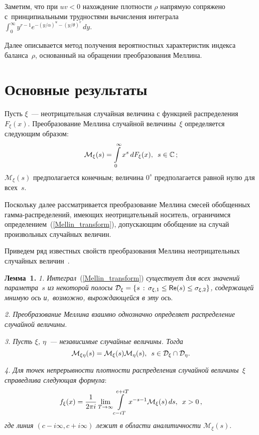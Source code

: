 \begin{multicols}{2}
Заметим, что при $uv<0$ нахождение плот\-ности $\rho$ напрямую сопряжено 
с~принципиальными трудностями вычисления интеграла
$\int\nolimits_0^{\infty}y^{r-1}e^{-(y/\alpha)^u-(y/\theta)^v} \, dy$.

Далее описывается метод получения вероятностных характеристик индекса баланса~$\rho$, 
основанный на обращении преобразования Меллина.

\section{Основные результаты}


Пусть $\xi$~--- неотрицательная случайная величина с функцией распределения~$F_\xi(x)$. 
Преобразование Меллина случайной величины~$\xi$ определяется~\cite{Zolotarev1957,Galambos2004} 
сле\-ду\-ющим образом:
\begin{equation}
\label{Mellin_transform}
\mathcal{M}_\xi(s) = \int\limits_{0}^{\infty}x^s \, dF_\xi(x),\enskip s\in\mathbb{C}\,;
\end{equation}
$\mathcal{M}_\xi(s)$ предполагается конечным; величина $0^s$ предполагается равной нулю для всех~$s$.

Поскольку далее рассматривается преобразование Меллина смесей обобщенных гам\-ма-рас\-пре\-де\-ле\-ний, 
име\-ющих неотрицательный носитель, ограничимся определением~(\ref{Mellin_transform}), 
допускающим \mbox{обобщение} на случай произвольных случайных величин.

Приведем ряд известных свойств преобразования Меллина неотрицательных случайных 
величин~\cite{Zolotarev1957,Galambos2004}.

\smallskip

\noindent
\textbf{Лемма~1.}
\textit{1. Интеграл}~(\ref{Mellin_transform}) \textit{существует для всех значений параметра~$s$ 
из некоторой полосы $\mathcal{D}_\xi\hm=\{s\,:\, \sigma_{\xi,1}\hm\le 
{\sf Re} (s)\hm\le\sigma_{\xi,2}\}$, содержащей мнимую ось и,~возможно, вырождающейся в эту ось}.

\textit{2. Преобразование Меллина взаимно однозначно определяет распределение случайной величины}.

\textit{3. Пусть $\xi$, $\eta$~--- независимые случайные величины. Тогда}
$$
\mathcal{M}_{\xi\eta}(s) = \mathcal{M}_\xi(s)\mathcal{M}_\eta(s), \enskip 
s\in\mathcal{D}_\xi\cap\mathcal{D}_\eta.
$$

\textit{4.
Для точек непрерывности плотности распределения случайной величины~$\xi$ справедлива следующая формула}:
$$f_{\xi}(x)
=\displaystyle\frac{\displaystyle 1\mathstrut}{\displaystyle 2\pi i\mathstrut}\lim\limits_{T\to\infty}\int\limits_{c-iT}^{c+iT}x^{-s-1}
\mathcal{M}_{\xi}(s) \, ds,\enskip x>0\,,
$$
\textit{где линия $(c-i\infty, c+i\infty)$ лежит в области аналитичности $\mathcal{M}_{\xi}(s)$}.


\end{multicols}
